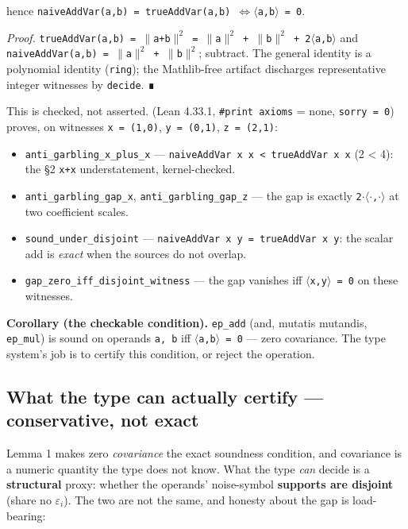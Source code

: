 \documentclass[sigplan,review,anonymous,10pt]{acmart}
\begin{document}
hence \texttt{naiveAddVar(a,b) = trueAddVar(a,b) $\Leftrightarrow\langle$a,b$\rangle$ = 0}.

\emph{Proof.} \texttt{trueAddVar(a,b) = $\|$a+b$\|^{2}$ = $\|$a$\|^{2}$ + $\|$b$\|^{2}$ + 2$\langle$a,b$\rangle$} and \texttt{naiveAddVar(a,b) = $\|$a$\|^{2}$ + $\|$b$\|^{2}$}; subtract. The general identity is a polynomial identity (\texttt{ring}); the Mathlib-free artifact discharges representative integer witnesses by \texttt{decide}. ∎

This is checked, not asserted.  (Lean 4.33.1, \texttt{\#print axioms} = none, \texttt{sorry = 0}) proves, on witnesses \texttt{x = (1,0)}, \texttt{y = (0,1)}, \texttt{z = (2,1)}:

\begin{itemize}
  \item \texttt{anti\_garbling\_x\_plus\_x} --- \texttt{naiveAddVar x x < trueAddVar x x} (2 < 4): the §2 \texttt{x+x} understatement, kernel-checked.
  \item \texttt{anti\_garbling\_gap\_x}, \texttt{anti\_garbling\_gap\_z} --- the gap is exactly \texttt{2$\cdot\langle\cdot$,$\cdot\rangle$} at two coefficient scales.
  \item \texttt{sound\_under\_disjoint} --- \texttt{naiveAddVar x y = trueAddVar x y}: the scalar add is \emph{exact} when the sources do not overlap.
  \item \texttt{gap\_zero\_iff\_disjoint\_witness} --- the gap vanishes iff \texttt{$\langle$x,y$\rangle$ = 0} on these witnesses.
\end{itemize}

\textbf{Corollary (the checkable condition).} \texttt{ep\_add} (and, mutatis mutandis, \texttt{ep\_mul}) is sound on operands \texttt{a, b} iff \texttt{$\langle$a,b$\rangle$ = 0} --- zero covariance. The type system's job is to certify this condition, or reject the operation.

\subsection{What the type can actually certify --- conservative, not exact}

Lemma 1 makes zero \emph{covariance} the exact soundness condition, and covariance is a numeric quantity the type does not know. What the type \emph{can} decide is a \textbf{structural} proxy: whether the operands' noise-symbol \textbf{supports are disjoint} (share no \texttt{$\varepsilon_{i}$}). The two are not the same, and honesty about the gap is load-bearing:
\end{document}
